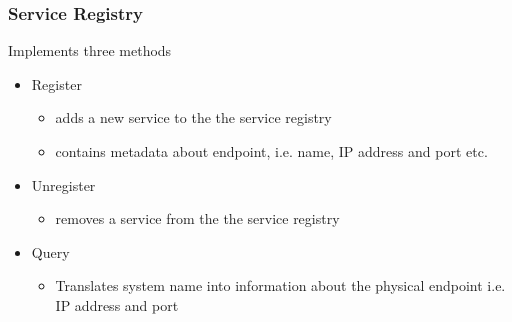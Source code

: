 \begin{frame}
    \frametitle{Service Registry}
    Implements three methods
    \begin{itemize}
        \item Register 
            \begin{itemize}
                \item  adds a new service to the the service registry 
                \item  contains metadata about endpoint, i.e. name, IP address and port etc.
            \end{itemize}
        \item Unregister
            \begin{itemize}
                \item  removes a service from the the service registry 
            \end{itemize}
        \item Query
            \begin{itemize}
                \item  Translates system name into information about the physical endpoint i.e. IP address and port
            \end{itemize}
    \end{itemize}
\end{frame}